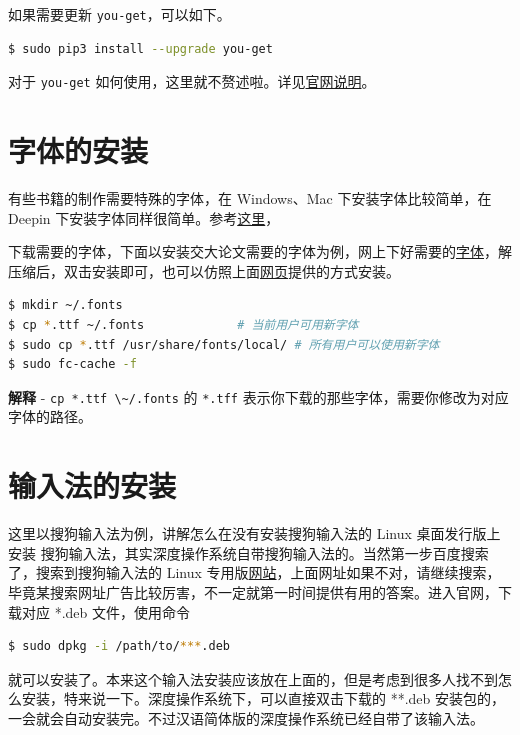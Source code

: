 \documentclass[doctor,openright,twoside]{sjtuthesis}
\newcommand{\passthrough}[1]{#1}
\theoremstyle{plain}
\theoremstyle{definition}
\theoremstyle{remark}
\theoremstyle{ocrenumbox}
\theoremstyle{plain}
\begin{document}
如果需要更新 \passthrough{\lstinline!you-get!}，可以如下。

\begin{lstlisting}[language=bash]
$ sudo pip3 install --upgrade you-get
\end{lstlisting}

对于 \passthrough{\lstinline!you-get!}
如何使用，这里就不赘述啦。详见\href{https://github.com/soimort/you-get}{官网说明}。

\section{字体的安装}

有些书籍的制作需要特殊的字体，在 Windows、Mac 下安装字体比较简单，在
Deepin
下安装字体同样很简单。参考\href{https://github.com/weijianwen/SJTUThesis/blob/master/tex/app_setup.tex}{这里}，

下载需要的字体，下面以安装交大论文需要的字体为例，网上下好需要的\href{http://download.csdn.net/download/bubifengyun/9695994}{字体}，解压缩后，双击安装即可，也可以仿照上面\href{https://github.com/weijianwen/SJTUThesis/blob/master/tex/app_setup.tex}{网页}提供的方式安装。

\begin{lstlisting}[language=bash]
$ mkdir ~/.fonts
$ cp *.ttf ~/.fonts             # 当前用户可用新字体
$ sudo cp *.ttf /usr/share/fonts/local/ # 所有用户可以使用新字体
$ sudo fc-cache -f
\end{lstlisting}

\textbf{解释} - \passthrough{\lstinline!cp *.ttf \~/.fonts!} 的
\passthrough{\lstinline!*.tff!}
表示你下载的那些字体，需要你修改为对应字体的路径。

\section{输入法的安装}

这里以搜狗输入法为例，讲解怎么在没有安装搜狗输入法的 Linux
桌面发行版上安装
搜狗输入法，其实深度操作系统自带搜狗输入法的。当然第一步百度搜索了，搜索到搜狗输入法的
Linux
专用版\href{http://pinyin.sogou.com/linux/}{网站}，上面网址如果不对，请继续搜索，毕竟某搜索网址广告比较厉害，不一定就第一时间提供有用的答案。进入官网，下载对应
*.deb 文件，使用命令

\begin{lstlisting}[language=bash]
$ sudo dpkg -i /path/to/***.deb
\end{lstlisting}

就可以安装了。本来这个输入法安装应该放在上面的，但是考虑到很多人找不到怎么安装，特来说一下。深度操作系统下，可以直接双击下载的
**.deb
安装包的，一会就会自动安装完。不过汉语简体版的深度操作系统已经自带了该输入法。
\end{document}
